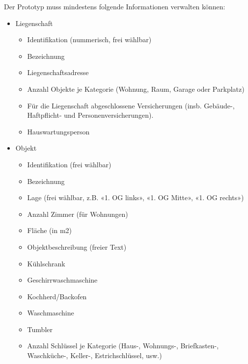 \vspace{3mm}
Der Prototyp muss mindestens folgende Informationen verwalten können:
\begin{itemize}
  \item Liegenschaft
  \begin{itemize}
    \item Identifikation (nummerisch, frei wählbar)
    \item Bezeichnung
    \item Liegenschaftsadresse
    \item Anzahl Objekte je Kategorie (Wohnung, Raum, Garage oder Parkplatz)
    \item Für die Liegenschaft abgeschlossene Versicherungen (insb. Gebäude-, Haftpflicht- und Personenversicherungen).
    \item Hauswartungsperson
  \end{itemize}
  \newpage
  \item Objekt
  \begin{itemize}
    \item Identifikation (frei wählbar)
    \item Bezeichnung
    \item Lage (frei wählbar, z.B. «1. OG links», «1. OG Mitte», «1. OG rechts»)
    \item Anzahl Zimmer (für Wohnungen)
    \item Fläche (in m2)
    \item Objektbeschreibung (freier Text)
    \item Kühlschrank \footnotemark{}
    \item Geschirrwaschmaschine\footnotemark[\value{footnote}]
    \item Kochherd/Backofen \footnotemark[\value{footnote}]
    \item Waschmaschine\footnotemark[\value{footnote}]
    \item Tumbler\footnotemark[\value{footnote}]
    \item Anzahl Schlüssel je Kategorie (Haus-, Wohnungs-, Briefkasten-, Waschküche-, Keller-, Estrichschlüssel, usw.)
  \end{itemize}


\end{itemize}
